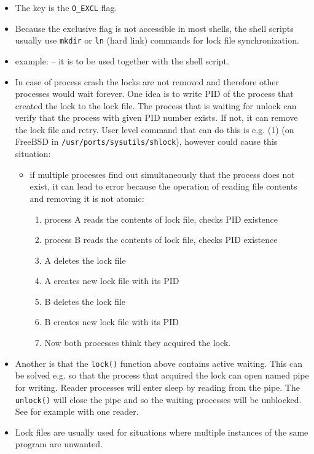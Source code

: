 \begin{itemize}
\item {} The key is the \texttt{O\_EXCL} flag.
\item Because the exclusive flag is not accessible in most shells, the shell
scripts usually use \texttt{mkdir} or \texttt{ln} (hard link) commands for
lock file synchronization.
\item example:  -- it is to be used together
with the  shell script.
\item In case of process crash the locks are not removed and therefore other
processes would wait forever. One idea is to write PID of the process
that created the lock to the lock file. The process that is waiting for unlock
can verify that the process with given PID number exists. If not, it can remove
the lock file and retry. User level command that can do this is e.g.
(1) (on FreeBSD in \texttt{/usr/ports/sysutils/shlock}),
however could cause this situation:
\begin{itemize}
\item {} if multiple processes find out simultaneously that
the process does not exist, it can lead to error because the operation of
reading file contents and removing it is not atomic:
\begin{enumerate}
\item process A reads the contents of lock file, checks PID existence
\item process B reads the contents of lock file, checks PID existence
\item A deletes the lock file
\item A creates new lock file with its PID
\item B deletes the lock file
\item B creates new lock file with its PID
\item Now both processes think they acquired the lock.
\end{enumerate}
\end{itemize}
\item Another  is that the \texttt{lock()} function above contains
active waiting.
This can be solved e.g. so that the process that acquired the lock can open
named pipe for writing. Reader processes will enter sleep by reading from the
pipe.
The \texttt{unlock()} will close the pipe and so the waiting processes will
be unblocked. See  for example with one reader.
\item Lock files are usually used for situations where multiple instances of
the same program are unwanted.
\end{itemize}

